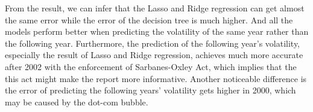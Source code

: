 \documentclass[11pt]{article}
\begin{document}

From the result, we can infer that the Lasso and Ridge regression can get almost the same error while the error of the decision tree is much higher. And all the models perform better when predicting the volatility of the same year rather than the following year. Furthermore, the prediction of the following year's volatility, especially the result of Lasso and Ridge regression, achieves much more accurate after 2002 with the enforcement of Sarbanes-Oxley Act, which implies that the this act might make the report more informative. Another noticeable difference is the error of predicting the following years' volatility gets higher in 2000, which may be caused by the dot-com bubble.
\end{document}

